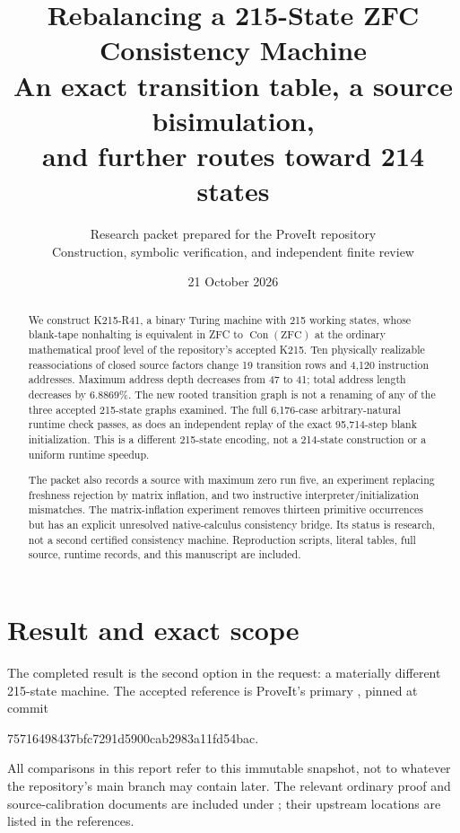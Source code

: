 \documentclass[11pt]{article}
\title{\textbf{Rebalancing a 215-State ZFC Consistency Machine}\\[5pt]
  \large An exact transition table, a source bisimulation,\\
  and further routes toward 214 states}
\author{Research packet prepared for the ProveIt repository\\
  \small Construction, symbolic verification, and independent finite review}
\date{21 October 2026}
\newcommand{\Con}{\operatorname{Con}}
\newcommand{\file}[1]{\texttt{\detokenize{#1}}}
\begin{document}
\maketitle
\begin{abstract}
We construct K215-R41, a binary Turing machine with 215 working states,
whose blank-tape nonhalting is equivalent in ZFC to $\Con(\mathrm{ZFC})$
at the ordinary mathematical proof level of the repository's accepted K215.
Ten physically realizable reassociations of closed source factors change
19 transition rows and 4,120 instruction addresses. Maximum address depth
decreases from 47 to 41; total address length decreases by 6.8869\%.
The new rooted transition graph is not a renaming of any of the three
accepted 215-state graphs examined. The full 6,176-case arbitrary-natural
runtime check passes, as does an independent replay of the exact
95,714-step blank initialization. This is a different 215-state encoding,
not a 214-state construction or a uniform runtime speedup.

The packet also records a source with maximum zero run five, an
experiment replacing freshness rejection by matrix inflation, and two
instructive interpreter/initialization mismatches. The matrix-inflation
experiment removes thirteen primitive occurrences but has an explicit
unresolved native-calculus consistency bridge. Its status is research,
not a second certified consistency machine. Reproduction scripts, literal
tables, full source, runtime records, and this manuscript are included.
\end{abstract}

\section{Result and exact scope}
\label{sec:result}

The completed result is the second option in the request: a materially
different 215-state machine. The accepted reference is ProveIt's primary
\file{candidate-k215}, pinned at commit
\begin{center}\small\ttfamily
75716498437bfc7291d5900cab2983a11fd54bac.
\end{center}
All comparisons in this report refer to this immutable snapshot, not to
whatever the repository's main branch may contain later. The relevant
ordinary proof and source-calibration documents are included under
\file{baseline/}; their upstream locations are listed in the references.
\end{document}
